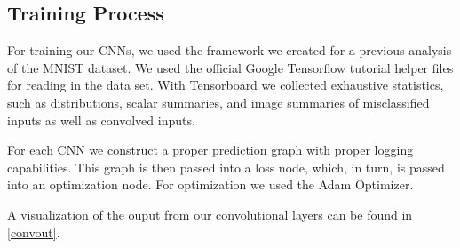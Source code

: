 \documentclass{article}
\begin{document}
\subsection{Training Process}

For training our CNNs, we used the framework we created for a previous analysis of the MNIST dataset. We used the official Google Tensorflow tutorial helper files for reading in the data set. With Tensorboard we collected exhaustive statistics, such as distributions, scalar summaries, and image summaries of misclassified inputs as well as convolved inputs.

For each CNN we construct a proper prediction graph with proper logging capabilities. This graph is then passed into a loss node, which, in turn, is passed into an optimization node. For optimization we used the Adam Optimizer.
 

A visualization of the ouput from our convolutional layers can be found in \ref{convout}.
\end{document}
